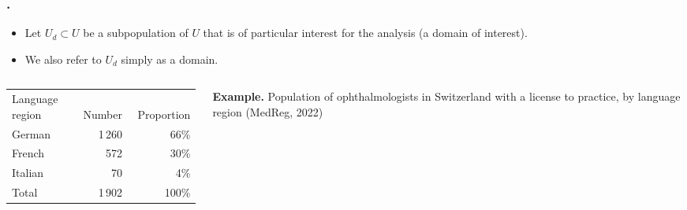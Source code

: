\documentclass{my_eth_beamer}
\numberwithin{equation}{section}
\begin{document}
\begin{frame}
    \frametitle{\insertsectionnumber.\insertsubsectionnumber~\insertsubsection}
    \begin{itemize}
    \setlength{\itemsep}{8pt}
        \item Let $U_d \subset U$ be a \alert{subpopulation} of $U$ that is of
            particular interest for the analysis (a domain of interest).
        \item We also refer to $U_d$ simply as a \alert{domain}.
    \end{itemize}
    \vspace{2em}
    \begin{columns}
        \begin{column}{0.5\textwidth}
            \begin{tabular}{lrr}
                \toprule
                \addlinespace
                Language region & $\quad$ Number & $\quad$ Proportion\\
                \addlinespace
                \midrule
                German     & 1\,260 &  66\%\\
                French     &    572 &  30\%\\
                Italian    &     70 &   4\%\\
                \midrule
                Total      & 1\,902 & 100\%\\
                \bottomrule
            \end{tabular}
        \end{column}
        \begin{column}{0.3\textwidth}

            \vspace{-5.5em}

            {\small
                \textcolor{fhnwblue}{\textbf{Example.}}
                Population of ophthalmologists in Switzerland with a license
                to practice, by language region
                (MedReg, 2022)
            }
        \end{column}
    \end{columns}
\end{frame}
\end{document}
